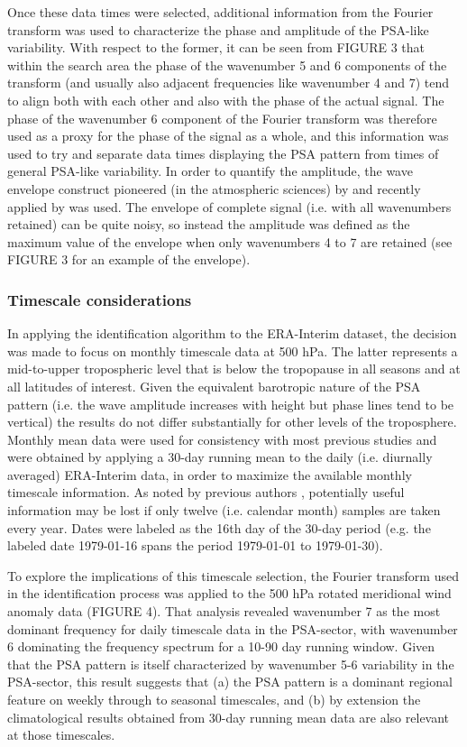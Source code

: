 Once these data times were selected, additional information from the Fourier transform was used to characterize the phase and amplitude of the PSA-like variability. With respect to the former, it can be seen from FIGURE 3 that within the search area the phase of the wavenumber 5 and 6 components of the transform (and usually also adjacent frequencies like wavenumber 4 and 7) tend to align both with each other and also with the phase of the actual signal. The phase of the wavenumber 6 component of the Fourier transform was therefore used as a proxy for the phase of the signal as a whole, and this information was used to try and separate data times displaying the PSA pattern from times of general PSA-like variability. In order to quantify the amplitude, the wave envelope construct pioneered (in the atmospheric sciences) by \citet{Zimin2003} and recently applied by \citet{IrvingSimmonds2015} was used. The envelope of complete signal (i.e. with all wavenumbers retained) can be quite noisy, so instead the amplitude was defined as the maximum value of the envelope when only wavenumbers 4 to 7 are retained (see FIGURE 3 for an example of the envelope).

\subsubsection{Timescale considerations}

In applying the identification algorithm to the ERA-Interim dataset, the decision was made to focus on monthly timescale data at 500 hPa. The latter represents a mid-to-upper tropospheric level that is below the tropopause in all seasons and at all latitudes of interest. Given the equivalent barotropic nature of the PSA pattern (i.e. the wave amplitude increases with height but phase lines tend to be vertical) the results do not differ substantially for other levels of the troposphere. Monthly mean data were used for consistency with most previous studies and were obtained by applying a 30-day running mean to the daily (i.e. diurnally averaged) ERA-Interim data, in order to maximize the available monthly timescale information. As noted by previous authors \citep[e.g.][]{Kidson1988}, potentially useful information may be lost if only twelve (i.e. calendar month) samples are taken every year. Dates were labeled as the 16th day of the 30-day period (e.g. the labeled date 1979-01-16 spans the period 1979-01-01 to 1979-01-30).

To explore the implications of this timescale selection, the Fourier transform used in the identification process was applied to the 500 hPa rotated meridional wind anomaly data (FIGURE 4). That analysis revealed wavenumber 7 as the most dominant frequency for daily timescale data in the PSA-sector, with wavenumber 6 dominating the frequency spectrum for a 10-90 day running window. Given that the PSA pattern is itself characterized by wavenumber 5-6 variability in the PSA-sector, this result suggests that (a) the PSA pattern is a dominant regional feature on weekly through to seasonal timescales, and (b) by extension the climatological results obtained from 30-day running mean data are also relevant at those timescales.

